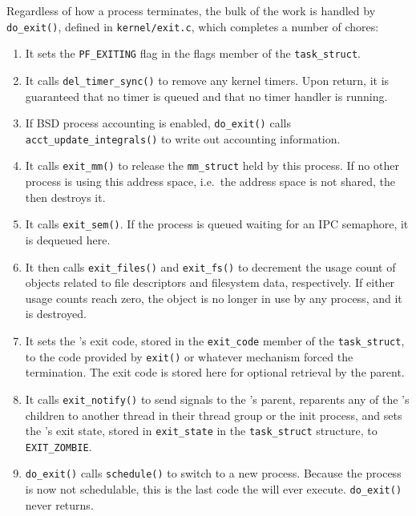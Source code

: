 Regardless of how a process terminates, the bulk of the work is handled by \texttt{do_exit()}, defined in \texttt{kernel/exit.c}, which completes a number of chores:
\begin{enumerate}
\item It sets the \texttt{PF_EXITING} flag in the flags member of the \texttt{task_struct}.
\item It calls \texttt{del_timer_sync()} to remove any kernel timers.
  Upon return, it is guaranteed that no timer is queued and that no timer handler is running.
\item If BSD process accounting is enabled, \texttt{do_exit()} calls \texttt{acct_update_integrals()} to write out accounting information.
\item It calls \texttt{exit_mm()} to release the \texttt{mm_struct} held by this process.
  If no other process is using this address space, i.e.\ the address space is not shared, the  then destroys it.
\item It calls \texttt{exit_sem()}.
  If the process is queued waiting for an IPC semaphore, it is dequeued here.
\item It then calls \texttt{exit_files()} and \texttt{exit_fs()} to decrement the usage count of objects related to file descriptors and filesystem data, respectively.
  If either usage counts reach zero, the object is no longer in use by any process, and it is destroyed.
\item It sets the ’s exit code, stored in the \texttt{exit_code} member of the \texttt{task_struct}, to the code provided by \texttt{exit()} or whatever  mechanism forced the termination.
  The exit code is stored here for optional retrieval by the parent.
\item It calls \texttt{exit_notify()} to send signals to the ’s parent, reparents any of the ’s children to another thread in their thread group or the init process, and sets the ’s exit state, stored in \texttt{exit_state} in the \texttt{task_struct} structure, to \texttt{EXIT_ZOMBIE}.
\item \texttt{do_exit()} calls \texttt{schedule()} to switch to a new process.
  Because the process is now not schedulable, this is the last code the  will ever execute.
  \texttt{do_exit()} never returns.
\end{enumerate}


